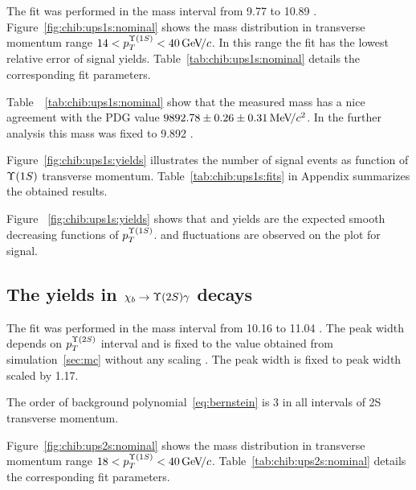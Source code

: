 The fit was performed in the mass interval from  9.77 \gevcc to 10.89 \gevcc.
Figure~\ref{fig:chib:ups1s:nominal} shows the mass distribution in transverse
momentum range $14 < p_T^{\OneS} < 40 \gevc$. In this range the fit has
the lowest relative error of signal yields. Table~\ref{tab:chib:ups1s:nominal}
details the corresponding fit parameters.




Table~~\ref{tab:chib:ups1s:nominal} show that the measured \chiboneOneP mass
has a  nice agreement with the PDG value $9892.78 \pm 0.26 \pm 0.31 {\mathrm{\,Me\kern -0.1em V\!/}c^2}$.
In the further analysis this mass was fixed to 9.892 \gevcc.

% 

Figure~\ref{fig:chib:ups1s:yields} illustrates the number of signal events as
function of $\Y1S$ transverse momentum.
Table~\ref{tab:chib:ups1s:fits} in Appendix summarizes the obtained results.



Figure ~\ref{fig:chib:ups1s:yields} shows that \chibOneP and
\chibThreeP yields are the expected smooth decreasing functions of $p_T^{\Y1S}$.
 and fluctuations are observed on the plot for \chibTwoP signal.




\subsection{The \texorpdfstring{\chib}{chib} yields in
	\texorpdfstring{$\chib \to \Y2S \gamma$}{chib --> Y(2S) gamma} decays}
\label{sec:chib:ups2s:fit}

The fit was performed in the mass interval from 10.16 \gevcc to 11.04 \gevcc.
The  \chiboneTwoP peak width depends on $p_T^{\Y2S}$ interval and is fixed to
the value obtained from simulation~\ref{sec:mc} without any scaling . The
\chiboneThreeP peak width is fixed to \chiboneTwoP peak width scaled by 1.17.


 The order of background polynomial~\ref{eq:bernstein} is 3 in all intervals of
 \Y2S transverse momentum.


Figure~\ref{fig:chib:ups2s:nominal} shows the mass distribution in transverse
momentum range $18 < p_T^{\OneS} < 40 \gevc$. Table~\ref{tab:chib:ups2s:nominal}
details the corresponding fit parameters.

